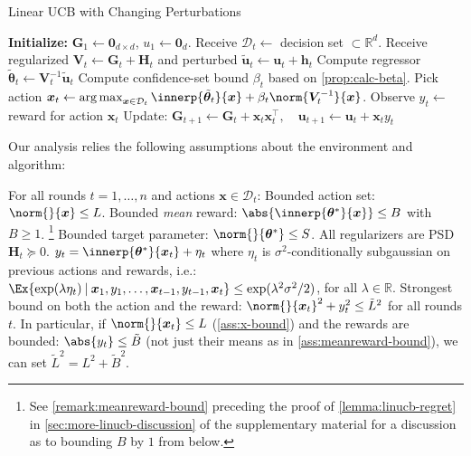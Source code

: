 \documentclass{article}
\renewcommand{\vec}[1]{\bm{#1}}
\newcommand{\inv}[1]{#1^{-1}}
\newcommand{\Real}{\mathds{R}}
\newcommand{\argmax}{\operatorname*{arg\,max}}
\newcommand\given[1][\delimsize]{%
  \providecommand{\delimsize}{}
  \nonscript\:#1\vert\allowbreak\nonscript\:\mathopen{}
}
\DeclarePairedDelimiter{\abs}||
\newcommand{\D}{\mathcal{D}}
\providecommand\transp{\top}
\let\transpsymbol\transp
\renewcommand{\transp}[1]{#1^\transpsymbol}
\newenvironment{assumptions*}[2][]{%
  \begin{assumptions}[#1]
    #2
    \begin{enumerate}[nolistsep]
      \setcounter{enumi}{\theassumption}
      \newcommand{\assume}[1][]{\item\label[assumption]{##1}}
    }{
      \setcounter{assumption}{\theenumi}
    \end{enumerate}
  \end{assumptions}%
}
\begin{document}
\begin{algorithm}[h]
  \caption{Linear UCB with Changing Perturbations}\label{alg:linucb}
  \begin{algorithmic}
    \State \textbf{Initialize:} $\vec G_1 \gets \vec 0_{d\times d}$,
    $u_1\gets \vec 0_{d}$.
    \State Receive $\D_t \gets{}$ decision set ${} \subset \Real^d$.
    \State Receive regularized $\vec V_t \gets \vec G_t + \vec H_t$ and perturbed $\tilde{\vec u}_t \gets \vec u_t + \vec h_t$
    \State Compute regressor $\tilde{\vec\theta}_{t} \gets \inv{\vec V_{t}}\tilde{\vec u}_{t}$
    \State Compute confidence-set bound $\beta_t$ based on \cref{prop:calc-beta}.
    \State Pick action $\vec x_t \gets \argmax_{\vec x\in\D_t}
    \innerp{\tilde{\vec \theta}_t}{\vec x} +
    \beta_t\norm{\inv{\vec V_t}}{\vec x}$.
    \State Observe $y_t \gets {}$ reward for action $\vec x_t$
    \State Update: $\vec G_{t+1} \gets \vec G_{t} + \vec x_t \transp{\vec x_t},
    \quad \vec u_{t+1} \gets \vec u_{t} + \vec x_t y_t$
    \EndFor
  \end{algorithmic}
\end{algorithm}

Our analysis relies the following assumptions about the environment
and algorithm:
\begin{assumptions*}{%
    For all rounds $t=1,\dotsc,n$ and actions $\vec x\in\D_t$:}
   Bounded action set: $\norm{}{\vec x} \le L$.
   Bounded \emph{mean} reward:
  $\abs{\innerp{\vec\theta^*}{\vec x}} \le B$ with $B\ge 1$.%
  \footnote{See \cref{remark:meanreward-bound} preceding the proof of
    \cref{lemma:linucb-regret} in \cref{sec:more-linucb-discussion} of
    the supplementary material for a discussion as to bounding $B$ by $1$ from below.} %
   Bounded target parameter:
  $\norm{}{\vec\theta^*} \le S$.   All
  regularizers are PSD $\vec H_t \succeq 0$.  
  $y_t = \innerp{\vec\theta^*}{\vec x_t} + \eta_t$ where $\eta_t$ is
  $\sigma^2$-conditionally subgaussian on previous actions and
  rewards, i.e.:
    $\Ex{\exp(\lambda\eta_t) \given \vec x_1, y_1, \dotsc, \vec x_{t-1}, y_{t-1}, \vec x_t}
    \le \exp(\lambda^2\sigma^2/2)$, for all $\lambda\in\Real$.
  Strongest bound on both the action and the reward:
  $\norm{}{\vec x_t}^2 + y_t^2 \le \tilde L^2$ for all rounds $t$.  In
  particular, if $\norm{}{\vec x_t} \le L$ (\cref{ass:x-bound}) and
  the rewards are bounded: $\abs{y_t} \le \tilde B$ (not just their
  means as in \cref{ass:meanreward-bound}), we can set $\tilde L^2 = L^2 + \tilde B^2$.
\end{assumptions*}
\end{document}
